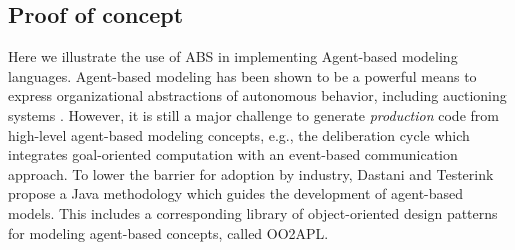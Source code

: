 
\subsection{Proof of concept}
\label{ag}
Here we illustrate the use of ABS in implementing Agent-based modeling languages.
Agent-based modeling has been shown to be a powerful means to express organizational abstractions of autonomous behavior, including auctioning systems \cite{agent_auction,bas16}.
However, it is still a major challenge to generate  \emph{production} code from  high-level agent-based modeling concepts, e.g., the deliberation cycle which integrates  goal-oriented computation with an event-based communication approach. 
To lower the barrier for adoption by industry, Dastani and Testerink \cite{bas16} propose a Java methodology which guides the development of agent-based models. 
This includes a corresponding library of object-oriented design patterns for modeling agent-based concepts, called OO2APL. 

